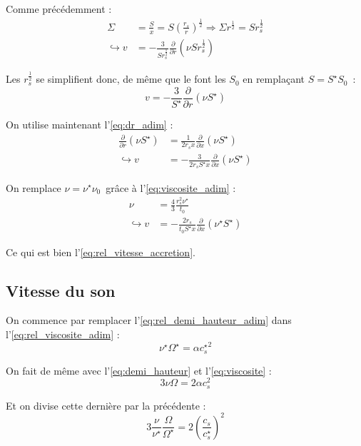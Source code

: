 Comme précédemment :
\begin{align}
    \Sigma &= \frac{S}{x} = S \left( \frac{r_s}{r} \right)^\frac{1}{2} \Rightarrow \Sigma r^\frac{1}{2} = S r_s^\frac{1}{2} \\
    \hookrightarrow v &= - \frac{3}{S r_s^\frac{1}{2}} \frac{\partial}{\partial r} \left(\nu S r_s^\frac{1}{2} \right)
\end{align}

Les $r_s^\frac{1}{2}$ se simplifient donc, de même que le font les $S_0$ en remplaçant $S = S^\star S_0$ :
\begin{equation}
    v = - \frac{3}{S^\star} \frac{\partial}{\partial r} \left(\nu S^\star \right)
\end{equation}

On utilise maintenant l’\cref{eq:dr_adim} :
\begin{align}
    \frac{\partial}{\partial r} \left(\nu S^\star \right) &= \frac{1}{2 r_s x} \frac{\partial}{\partial x} \left( \nu S^\star \right) \\
    \hookrightarrow v &= - \frac{3}{2 r_s S^\star x} \frac{\partial}{\partial x} \left(\nu S^\star \right)
\end{align}

On remplace $\nu = \nu^\star \nu_0$ grâce à l’\cref{eq:viscosite_adim} :
\begin{align}
    \nu &= \frac{4}{3} \frac{r_s^2 \nu^\star}{t_0} \\
    \hookrightarrow v &= - \frac{2 r_s}{t_0 S^\star x} \frac{\partial}{\partial x} \left(\nu^\star S^\star \right)
\end{align}

Ce qui est bien l’\cref{eq:rel_vitesse_accretion}.

\subsection{Vitesse du son}

On commence par remplacer l’\cref{eq:rel_demi_hauteur_adim} dans l’\cref{eq:rel_viscosite_adim} :
\begin{equation}
    \nu^\star \Omega^\star = \alpha {c_s^\star}^2
\end{equation}

On fait de même avec l’\cref{eq:demi_hauteur} et l’\cref{eq:viscosite} :
\begin{equation}
    3 \nu \Omega = 2 \alpha c_s^2
\end{equation}

Et on divise cette dernière par la précédente :
\begin{equation}
    3 \frac{\nu}{\nu^\star} \frac{\Omega}{\Omega^\star} = 2 \left(\frac{c_s}{c_s^\star}\right)^2
\end{equation}

